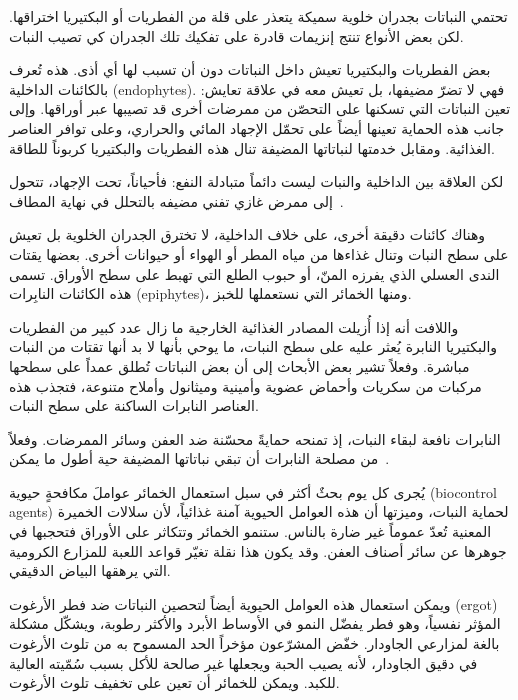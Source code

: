 تحتمي النباتات بجدران خلوية سميكة يتعذر على قلة من الفطريات أو البكتيريا اختراقها. لكن بعض الأنواع تنتج إنزيمات قادرة على تفكيك تلك الجدران كي تصيب النبات.

بعض الفطريات والبكتيريا تعيش داخل النباتات دون أن تسبب لها أي أذى. هذه تُعرف بالكائنات الداخلية \textenglish{(endophytes)}. فهي لا تضرّ مضيفها، بل تعيش معه في علاقة تعايش: تعين النباتات التي تسكنها على التحصّن من ممرضات أخرى قد تصيبها عبر أوراقها. وإلى جانب هذه الحماية تعينها أيضاً على تحمّل الإجهاد المائي والحراري، وعلى توافر العناصر الغذائية. ومقابل خدمتها لنباتاتها المضيفة تنال هذه الفطريات والبكتيريا كربوناً للطاقة.

لكن العلاقة بين الداخلية والنبات ليست دائماً متبادلة النفع: فأحياناً، تحت الإجهاد، تتحول إلى ممرض غازي تفني مضيفه بالتحلل في نهاية المطاف~\cite{endophytes+in+plants}.

وهناك كائنات دقيقة أخرى، على خلاف الداخلية، لا تخترق الجدران الخلوية بل تعيش على سطح النبات وتنال غذاءها من مياه المطر أو الهواء أو حيوانات أخرى. بعضها يقتات الندى العسلي الذي يفرزه المنّ، أو حبوب الطلع التي تهبط على سطح الأوراق. تسمى هذه الكائنات النابِرات \textenglish{(epiphytes)}، ومنها الخمائر التي نستعملها للخبز.

واللافت أنه إذا أُزيلت المصادر الغذائية الخارجية ما زال عدد كبير من الفطريات والبكتيريا النابرة يُعثر عليه على سطح النبات، ما يوحي بأنها لا بد أنها تقتات من النبات مباشرة. وفعلاً تشير بعض الأبحاث إلى أن بعض النباتات تُطلق عمداً على سطحها مركبات من سكريات وأحماض عضوية وأمينية وميثانول وأملاح متنوعة، فتجذب هذه العناصر النابرات الساكنة على سطح النبات.

النابرات نافعة لبقاء النبات، إذ تمنحه حمايةً محسّنة ضد العفن وسائر الممرضات. وفعلاً من مصلحة النابرات أن تبقي نباتاتها المضيفة حية أطول ما يمكن~\cite{leaf+surface+sugars+epiphytes}.

يُجرى كل يوم بحثٌ أكثر في سبل استعمال الخمائر عواملَ مكافحةٍ حيوية \textenglish{(biocontrol agents)} لحماية النبات، وميزتها أن هذه العوامل الحيوية آمنة غذائياً، لأن سلالات الخميرة المعنية تُعدّ عموماً غير ضارة بالناس. ستنمو الخمائر وتتكاثر على الأوراق فتحجبها في جوهرها عن سائر أصناف العفن. وقد يكون هذا نقلة تغيّر قواعد اللعبة للمزارع الكرومية التي يرهقها البياض الدقيقي.

ويمكن استعمال هذه العوامل الحيوية أيضاً لتحصين النباتات ضد فطر الأرغوت \textenglish{(ergot)} المؤثر نفسياً، وهو فطر يفضّل النمو في الأوساط الأبرد والأكثر رطوبة، ويشكّل مشكلة بالغة لمزارعي الجاودار. خفّض المشرّعون مؤخراً الحد المسموح به من تلوث الأرغوت في دقيق الجاودار، لأنه يصيب الحبة ويجعلها غير صالحة للأكل بسبب سُمّيته العالية للكبد. ويمكن للخمائر أن تعين على تخفيف تلوث الأرغوت.

